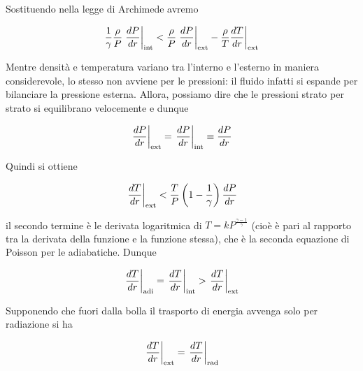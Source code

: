 
Sostituendo nella legge di Archimede avremo

$$\frac{1}{\gamma} \frac{\rho}{P} \left. \frac{dP}{dr} \right|_{\rm int} < \frac{\rho}{P}\left. \frac{dP}{dr} \right|_{\rm ext} - \frac{\rho}{T}\frac{dT}{dr}\bigg|_{\rm ext}$$

Mentre densità e temperatura variano tra l'interno e l'esterno in maniera considerevole, lo stesso non avviene per le pressioni: il fluido infatti si espande per bilanciare la pressione esterna. Allora, possiamo dire che le pressioni strato per strato si
equilibrano velocemente e dunque

$$\left. \frac{dP}{dr} \right|_{\rm ext}
=\left. \frac{dP}{dr} \right|_{\rm int}
\equiv \frac{dP}{dr}$$

Quindi si ottiene

$$\left. \frac{dT}{dr} \right|_{\rm ext} < \frac{T}{P}\left(1-\frac{1}{\gamma}\right)\frac{dP}{dr}$$

il secondo termine è le derivata logaritmica di $T=k P^{\frac{\gamma - 1}{\gamma}}$ (cioè è pari al rapporto tra la derivata della funzione e la funzione stessa), che è la seconda equazione di Poisson per le adiabatiche. Dunque

$$\left. \frac{dT}{dr} \right|_{\rm adi}
=\left. \frac{dT}{dr} \right|_{\rm int}
>\left. \frac{dT}{dr} \right|_{\rm ext}$$

Supponendo che fuori dalla bolla il trasporto di energia avvenga solo per radiazione si ha

$$\left. \frac{dT}{dr} \right|_{\rm ext}=\left. \frac{dT}{dr} \right|_{\rm rad}$$





